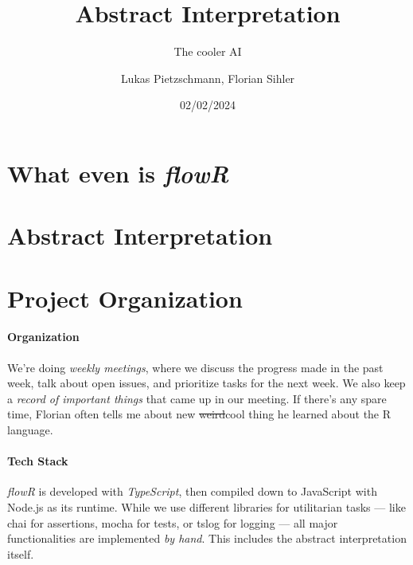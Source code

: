 \documentclass[color,coloraccent=red!60!black]{poster}
\title{Abstract Interpretation}
\subtitle{The cooler AI}
\author{Lukas Pietzschmann, Florian Sihler}
\institute{Institute of Software Engineering and Programming Languages}
\date{02/02/2024}
\def\flowr{\textit{flowR}}
\begin{document}
\maketitle


\begin{multicols}{3}
	\begin{minipage}{\dimexpr2\columnwidth+\columnsep\relax}
		\section*{What even is \flowr}
		\lipsum[4]
		\section*{Abstract Interpretation}
		\lipsum[1-3]
	\end{minipage}\vfill\columnbreak\null\columnbreak
	\section*{Project Organization}
	\paragraph{Organization} We're doing \emph{weekly meetings}, where we discuss the
	progress made in the past week, talk about open issues, and prioritize tasks for the
	next week. We also keep a \emph{record of important things} that came up in our
	meeting. If there's any spare time, Florian often tells me about new
	\sout{weird}cool thing he learned about the R language.
	\paragraph{Tech Stack} \flowr{} is developed with \emph{TypeScript}, then compiled
	down to JavaScript with Node.js as its runtime. While we use different libraries for
	utilitarian tasks --- like chai for assertions, mocha for tests, or tslog for
	logging --- all major functionalities are implemented \emph{by hand}. This includes
	the abstract interpretation itself.

\end{multicols}
\end{document}
